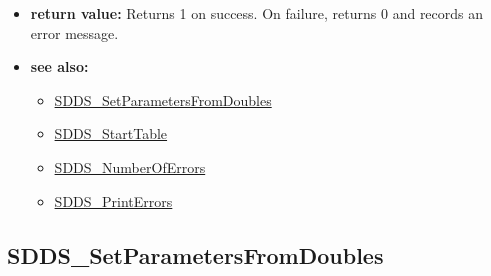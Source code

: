 \documentclass[11pt]{article}
\newcommand{\progref}[1]{\hyperref{SDDS_#1}{{\tt SDDS\_#1} (}{)}{SDDS_#1}}
\begin{document}
\begin{itemize}
\begin{itemize}
\end{itemize}
\item {\bf return value:}\newline
Returns 1 on success. On failure, returns 0 and records an error message.
\item {\bf see also:}
\begin{itemize}
\item \progref{SetParametersFromDoubles}
\item \progref{StartTable}
\item \progref{NumberOfErrors}
\item \progref{PrintErrors}
\end{itemize}
\end{itemize}

\subsection{SDDS\_SetParametersFromDoubles}
\label{SDDS_SetParametersFromDoubles}
\end{document}
